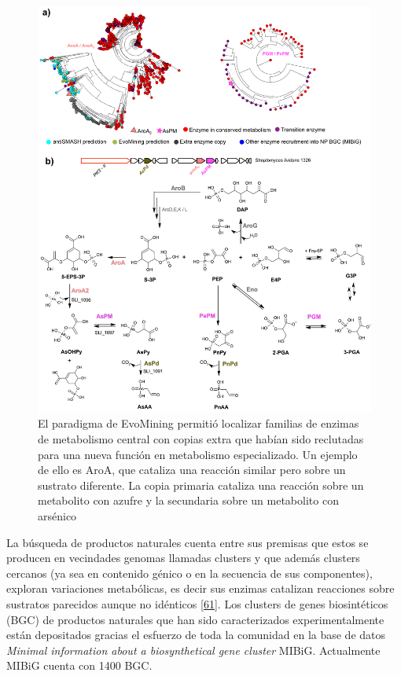 \documentclass[12pt,twoside]{reedthesis}
\begin{document}
  \begin{figure}[h!tbp]
  \centering
  \includegraphics[angle = 0,scale = 0.6]{Arseno.pdf}
  \caption[El paradigma de EvoMining permitió localizar familias de enzimas de metabolismo central con copias extra que habían sido reclutadas para una nueva función en metabolismo especializado. Un ejemplo de ello es AroA, que cataliza una reacción similar pero sobre un sustrato diferente. La copia primaria cataliza una reacción sobre un metabolito con azufre y la secundaria sobre un metabolito con arsénico]{\normalsize{El paradigma de EvoMining permitió localizar familias de enzimas de metabolismo central con copias extra que habían sido reclutadas para una nueva función en metabolismo especializado. Un ejemplo de ello es AroA, que cataliza una reacción similar pero sobre un sustrato diferente. La copia primaria cataliza una reacción sobre un metabolito con azufre y la secundaria sobre un metabolito con arsénico}}
  \label{fig:Arseno}
  \end{figure}
  
  La búsqueda de productos naturales cuenta entre sus premisas que estos
  se producen en vecindades genomas llamadas clusters y que además
  clusters cercanos (ya sea en contenido génico o en la secuencia de sus
  componentes), exploran variaciones metabólicas, es decir sus enzimas
  catalizan reacciones sobre sustratos parecidos aunque no idénticos
  {[}\protect\hyperlink{ref-cruz-morales_phylogenomic_2016}{61}{]}. Los
  clusters de genes biosintéticos (BGC) de productos naturales que han
  sido caracterizados experimentalmente están depositados gracias el
  esfuerzo de toda la comunidad en la base de datos \emph{Minimal
  information about a biosynthetical gene cluster} MIBiG. Actualmente
  MIBiG cuenta con 1400 BGC.
  
\end{document}

